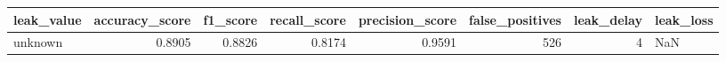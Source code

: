 \begin{tabular}{lrrrrrrl}
\toprule
leak\_value & accuracy\_score & f1\_score & recall\_score & precision\_score & false\_positives & leak\_delay & leak\_loss \\
\midrule
unknown & 0.8905 & 0.8826 & 0.8174 & 0.9591 & 526 & 4 & NaN \\
\bottomrule
\end{tabular}
